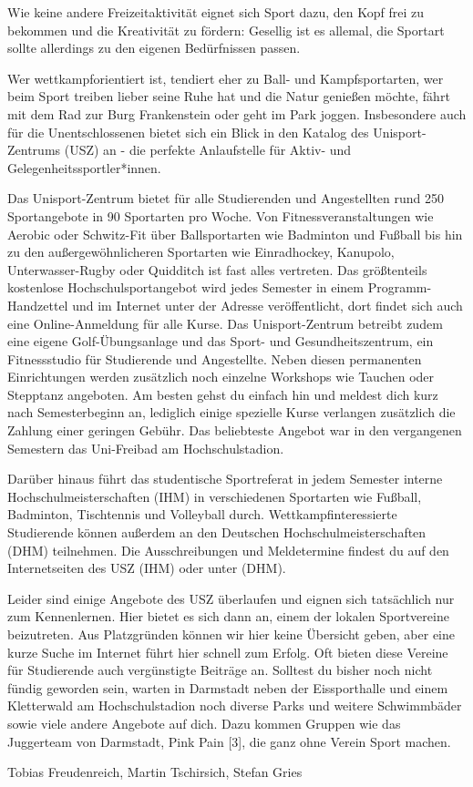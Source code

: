 {Wie keine andere Freizeitaktivität eignet sich Sport dazu, den Kopf frei zu bekommen und die Kreativität zu fördern: Gesellig ist es allemal, die Sportart sollte allerdings zu den eigenen Bedürfnissen passen.
}{
    Wer wettkampforientiert ist, tendiert eher zu Ball- und Kampfsportarten, wer beim Sport treiben lieber seine Ruhe hat und die Natur genießen möchte, fährt mit dem Rad zur Burg Frankenstein oder geht im Park joggen.
    Insbesondere auch für die Unentschlossenen bietet sich ein Blick in den Katalog des Unisport-Zentrums (USZ) an - die perfekte Anlaufstelle für Aktiv- und Gelegenheitssportler*innen.

    Das Unisport-Zentrum bietet für alle Studierenden und Angestellten rund 250 Sportangebote in 90 Sportarten pro Woche. Von Fitnessveranstaltungen wie Aerobic oder Schwitz-Fit über Ballsportarten wie Badminton und Fußball bis hin zu den außergewöhnlicheren Sportarten wie Einradhockey, Kanupolo, Unterwasser-Rugby oder Quidditch ist fast alles vertreten.
    Das größtenteils kostenlose Hochschulsportangebot wird jedes Semester in einem Programm-Handzettel und im Internet unter der Adresse \footnotemark[1]  veröffentlicht, dort findet sich auch eine Online-Anmeldung für alle Kurse. Das Unisport-Zentrum betreibt zudem eine eigene Golf-Übungsanlage und das Sport- und Gesundheitszentrum, ein Fitnessstudio für Studierende und Angestellte. Neben diesen permanenten Einrichtungen werden zusätzlich noch einzelne Workshops wie Tauchen oder Stepptanz angeboten.
    Am besten gehst du einfach hin und meldest dich kurz nach Semesterbeginn an, lediglich einige spezielle Kurse verlangen zusätzlich die Zahlung einer geringen Gebühr. Das beliebteste Angebot war in den vergangenen Semestern das Uni-Freibad am Hochschulstadion.

    Darüber hinaus führt das studentische Sportreferat in jedem Semester interne Hochschulmeisterschaften (IHM) in verschiedenen Sportarten wie Fußball, Badminton, Tischtennis und Volleyball durch. Wettkampfinteressierte Studierende können außerdem an den Deutschen Hochschulmeisterschaften (DHM) teilnehmen. Die Ausschreibungen und Meldetermine findest du auf den Internetseiten des USZ (IHM) oder unter \footnotemark[2] (DHM).

    Leider sind einige Angebote des USZ überlaufen und eignen sich tatsächlich nur zum Kennenlernen. Hier bietet es sich dann an, einem der lokalen Sportvereine beizutreten. Aus Platzgründen können wir hier keine Übersicht geben, aber eine kurze Suche im Internet führt hier schnell zum Erfolg. Oft bieten diese Vereine für Studierende auch vergünstigte Beiträge an.
    Solltest du bisher noch nicht fündig geworden sein, warten in Darmstadt neben der Eissporthalle und einem Kletterwald am Hochschulstadion noch diverse Parks und weitere Schwimmbäder sowie viele andere Angebote auf dich.
    Dazu kommen Gruppen wie das Juggerteam von Darmstadt, Pink Pain [3], die ganz ohne Verein Sport machen.
}
{Tobias Freudenreich, Martin Tschirsich, Stefan Gries}

\newpage
